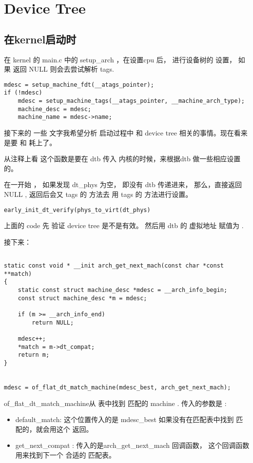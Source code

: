 \chapter{Device Tree}

\section{在kernel启动时}

在 kernel 的 main.c 中的 setup\_arch ，在设置cpu 后， 
进行设备树的 设置， 如果 返回 NULL 
则会去尝试解析  tags.
\begin{lstlisting}
mdesc = setup_machine_fdt(__atags_pointer);
if (!mdesc)
	mdesc = setup_machine_tags(__atags_pointer, __machine_arch_type);
    machine_desc = mdesc;
	machine_name = mdesc->name;
\end{lstlisting}



接下来的 一些 文字我希望分析 启动过程中 和 device tree 相关的事情。现在看来 是要 和 
耗上了。




从注释上看 这个函数是要在  dtb 传入 内核的时候，来根据dtb 做一些相应设置的。  


在一开始 ，  如果发现 dt\_phys 为空， 即没有 dtb 传递进来， 那么，直接返回NULL , 返回后会又 tags 的 方法去 用 tags 的 方法进行设置。 
\begin{lstlisting}
early_init_dt_verify(phys_to_virt(dt_phys)
\end{lstlisting}
上面的 code 先 验证 device tree 是不是有效。 然后用  dtb 的 虚拟地址 赋值为 \label{initial\_boot\_params} .





接下来：

\begin{lstlisting}

static const void * __init arch_get_next_mach(const char *const **match)
{
	static const struct machine_desc *mdesc = __arch_info_begin;
	const struct machine_desc *m = mdesc;

	if (m >= __arch_info_end)
		return NULL;

	mdesc++;
	*match = m->dt_compat;
	return m;
}


mdesc = of_flat_dt_match_machine(mdesc_best, arch_get_next_mach);
\end{lstlisting}

of\_flat\_dt\_match\_machine从 表中找到 匹配的 machine . 传入的参数是 :
\begin{itemize}
    \item default\_match:  这个位置传入的是 mdesc\_best  如果没有在匹配表中找到 匹配的，就会用这个
    返回。
    \item get\_next\_compat : 传入的是arch\_get\_next\_mach  回调函数， 这个回调函数
    用来找到下一个 合适的 匹配表。
    
\end{itemize}



